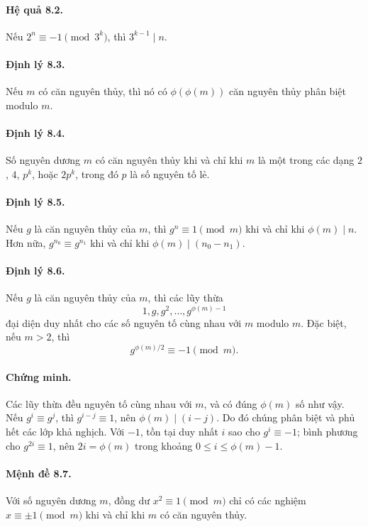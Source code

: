 \documentclass[11pt]{article}
\begin{document}
\paragraph{Hệ quả 8.2.}
Nếu \(2^n\equiv-1\pmod{3^k}\), thì \(3^{k-1}\mid n\).

\paragraph{Định lý 8.3.}
Nếu \(m\) có căn nguyên thủy, thì nó có \(\phi(\phi(m))\) căn nguyên thủy phân
biệt modulo \(m\).

\paragraph{Định lý 8.4.}
Số nguyên dương \(m\) có căn nguyên thủy khi và chỉ khi \(m\) là một trong các
dạng \(2\), \(4\), \(p^k\), hoặc \(2p^k\), trong đó \(p\) là số nguyên tố lẻ.

\paragraph{Định lý 8.5.}
Nếu \(g\) là căn nguyên thủy của \(m\), thì \(g^n\equiv1\pmod m\) khi và chỉ
khi \(\phi(m)\mid n\). Hơn nữa, \(g^{n_0}\equiv g^{n_1}\) khi và chỉ khi
\(\phi(m)\mid(n_0-n_1)\).

\paragraph{Định lý 8.6.}
Nếu \(g\) là căn nguyên thủy của \(m\), thì các lũy thừa
\[
 1,g,g^2,\ldots,g^{\phi(m)-1}
\]
đại diện duy nhất cho các số nguyên tố cùng nhau với \(m\) modulo \(m\). Đặc
biệt, nếu \(m>2\), thì
\[
 g^{\phi(m)/2}\equiv-1\pmod m.
\]

\paragraph{Chứng minh.}
Các lũy thừa đều nguyên tố cùng nhau với \(m\), và có đúng \(\phi(m)\) số như
vậy. Nếu \(g^i\equiv g^j\), thì \(g^{i-j}\equiv1\), nên \(\phi(m)\mid(i-j)\).
Do đó chúng phân biệt và phủ hết các lớp khả nghịch. Với \(-1\), tồn tại duy
nhất \(i\) sao cho \(g^i\equiv-1\); bình phương cho \(g^{2i}\equiv1\), nên
\(2i=\phi(m)\) trong khoảng \(0\le i\le\phi(m)-1\).

\paragraph{Mệnh đề 8.7.}
Với số nguyên dương \(m\), đồng dư \(x^2\equiv1\pmod m\) chỉ có các nghiệm
\(x\equiv\pm1\pmod m\) khi và chỉ khi \(m\) có căn nguyên thủy.
\end{document}
